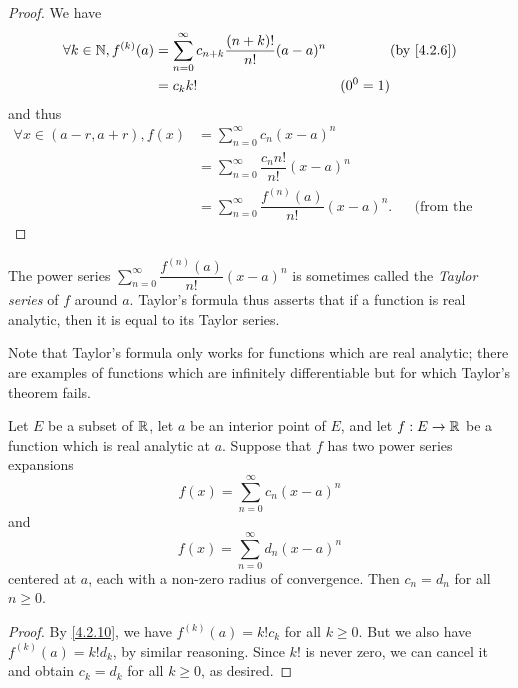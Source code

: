 \begin{proof}
  We have
  \begin{align*}
    \forall k \in \N, f^{(k)}(a) & = \sum_{n = 0}^\infty c_{n + k} \dfrac{(n + k)!}{n!} (a - a)^n &           & \by{4.2.6} \\
                                 & = c_k k!                                                       & (0^0 = 1)
  \end{align*}
  and thus
  \begin{align*}
    \forall x \in (a - r, a + r), f(x) & = \sum_{n = 0}^\infty c_n (x - a)^n                                                        \\
                                       & = \sum_{n = 0}^\infty \dfrac{c_n n!}{n!} (x - a)^n                                         \\
                                       & = \sum_{n = 0}^\infty \dfrac{f^{(n)}(a)}{n!} (x - a)^n. &  & \text{(from the proof above)}
  \end{align*}
\end{proof}

\begin{note}
  The power series \(\sum_{n = 0}^\infty \dfrac{f^{(n)}(a)}{n!} (x - a)^n\) is sometimes called the \emph{Taylor series} of \(f\) around \(a\).
  Taylor's formula thus asserts that if a function is real analytic, then it is equal to its Taylor series.
\end{note}

\begin{rmk}\label{4.2.11}
  Note that Taylor's formula only works for functions which are real analytic;
  there are examples of functions which are infinitely differentiable but for which Taylor's theorem fails.
\end{rmk}

\begin{cor}\label{4.2.12}
  Let \(E\) be a subset of \(\mathbb{R}\), let \(a\) be an interior point of \(E\), and let \(f : E \to \mathbb{R}\) be a function which is real analytic at \(a\).
  Suppose that \(f\) has two power series expansions
  \[
    f(x) = \sum_{n = 0}^\infty c_n (x - a)^n
  \]
  and
  \[
    f(x) = \sum_{n = 0}^\infty d_n (x - a)^n
  \]
  centered at \(a\), each with a non-zero radius of convergence.
  Then \(c_n = d_n\) for all \(n \geq 0\).
\end{cor}

\begin{proof}
  By \cref{4.2.10}, we have \(f^{(k)}(a) = k! c_k\) for all \(k \geq 0\).
  But we also have \(f^{(k)}(a) = k! d_k\), by similar reasoning.
  Since \(k!\) is never zero, we can cancel it and obtain \(c_k = d_k\) for all \(k \geq 0\), as desired.
\end{proof}

